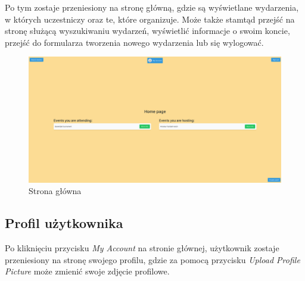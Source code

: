 \documentclass[11pt,a4paper]{article}
\begin{document}
Po tym zostaje przeniesiony na stronę główną, gdzie są wyświetlane wydarzenia, w których uczestniczy oraz te, które organizuje. Może także stamtąd przejść na stronę służącą wyszukiwaniu wydarzeń, wyświetlić informacje o swoim koncie, przejść do formularza tworzenia nowego wydarzenia lub się wylogować.

\begin{figure} [H]
    \centering
    \includegraphics[width=1\linewidth]{pages/home.png}
    \caption{Strona główna}
\end{figure}

\subsection{Profil użytkownika}

Po kliknięciu przycisku \textit{My Account} na stronie głównej, użytkownik zostaje przeniesiony na stronę swojego profilu, gdzie za pomocą przycisku \textit{Upload Profile Picture} może zmienić swoje zdjęcie profilowe.
\end{document}
